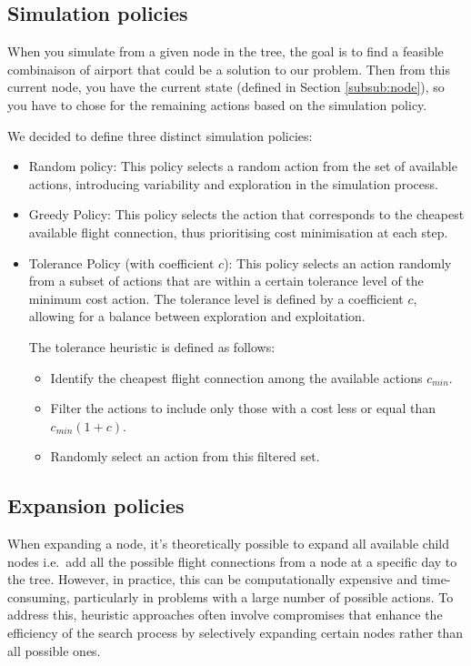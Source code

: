 \subsection{Simulation policies}
When you simulate from a given node in the tree, the goal is to find a feasible combinaison of airport that could be a solution to our problem.
Then from this current node, you have the current state (defined in Section \ref{subsub:node}), so you have to chose for the remaining actions based on the simulation policy.

We decided to define three distinct simulation policies:

\begin{itemize}
    \item Random policy: This policy selects a random action from the set of available actions, introducing variability and exploration in the simulation process.
    \item Greedy Policy: This policy selects the action that corresponds to the cheapest available flight connection, thus prioritising cost minimisation at each step.

    \item Tolerance Policy (with coefficient $c$):
          This policy selects an action randomly from a subset of actions that are within a certain tolerance level of the minimum cost action. The tolerance level is defined by a coefficient $c$, allowing for a balance between exploration and exploitation.

          The tolerance heuristic is defined as follows:
          \begin{itemize}
              \item Identify the cheapest flight connection among the available actions $c_{min}$.
              \item Filter the actions to include only those with a cost less or equal than $c_{min}(1+c) $.
              \item Randomly select an action from this filtered set.
          \end{itemize}

\end{itemize}

\subsection{Expansion policies}
When expanding a node, it’s theoretically possible to expand all available child nodes i.e.\ add all the possible flight connections from a node at a specific day to the tree. However, in practice, this can be computationally expensive and time-consuming, particularly in problems with a large number of possible actions. To address this, heuristic approaches often involve compromises that enhance the efficiency of the search process by selectively expanding certain nodes rather than all possible ones.

